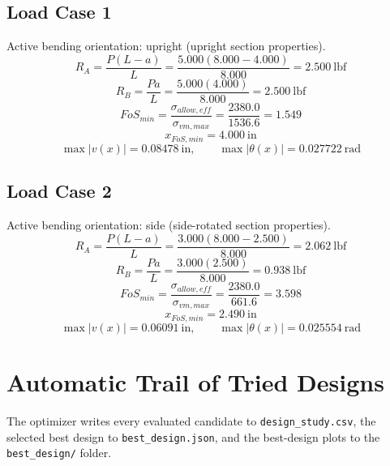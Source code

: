 \documentclass[11pt]{article}
\begin{document}
\subsection*{Load Case 1}
Active bending orientation: upright (upright section properties).
\[R_A = \frac{P(L-a)}{L} = \frac{5.000(8.000-4.000)}{8.000} = 2.500\ \mathrm{lbf}\]
\[R_B = \frac{Pa}{L} = \frac{5.000(4.000)}{8.000} = 2.500\ \mathrm{lbf}\]
\[FoS_{min} = \frac{\sigma_{allow,eff}}{\sigma_{vm,max}} = \frac{2380.0}{1536.6} = 1.549\]
\[x_{FoS,min} = 4.000\ \mathrm{in}\]
\[\max |v(x)| = 0.08478\ \mathrm{in}, \qquad \max |\theta(x)| = 0.027722\ \mathrm{rad}\]
\subsection*{Load Case 2}
Active bending orientation: side (side-rotated section properties).
\[R_A = \frac{P(L-a)}{L} = \frac{3.000(8.000-2.500)}{8.000} = 2.062\ \mathrm{lbf}\]
\[R_B = \frac{Pa}{L} = \frac{3.000(2.500)}{8.000} = 0.938\ \mathrm{lbf}\]
\[FoS_{min} = \frac{\sigma_{allow,eff}}{\sigma_{vm,max}} = \frac{2380.0}{661.6} = 3.598\]
\[x_{FoS,min} = 2.490\ \mathrm{in}\]
\[\max |v(x)| = 0.06091\ \mathrm{in}, \qquad \max |\theta(x)| = 0.025554\ \mathrm{rad}\]

\section*{Automatic Trail of Tried Designs}
The optimizer writes every evaluated candidate to \texttt{design\_study.csv}, the selected best design to \texttt{best\_design.json}, and the best-design plots to the \texttt{best\_design/} folder.
\end{document}
